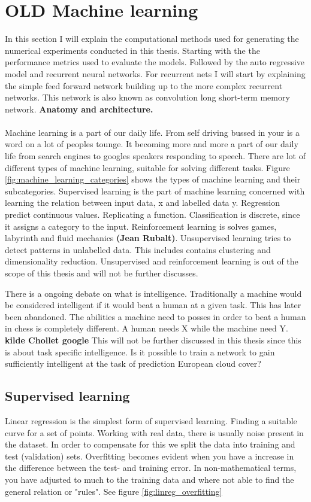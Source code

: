 \section{OLD Machine learning} \label{sec:intro_machine_learning}
In this section I will explain the computational methods used for generating the numerical experiments conducted in this thesis. Starting with the the performance metrics used to evaluate the models. Followed by the auto regressive model and recurrent neural networks. For recurrent nets I will start by explaining the simple feed forward network building up to the more complex recurrent networks. This network is also known as convolution long short-term memory network. \textbf{Anatomy and architecture.} 
\\ \\
Machine learning is a part of our daily life. From self driving bussed in  your is a word on a lot of peoples tounge. It becoming more and more a part of our daily life from search engines to googles speakers responding to speech. There are lot of different types of machine learning, suitable for solving different tasks. Figure \ref{fig:machine_learning_categories} shows the types of machine learning and their subcategories. Supervised learning is the part of machine learning concerned with learning the relation between input data, x and labelled data y. Regression predict continuous values. Replicating a function. Classification is discrete, since it assigns a category to the input. Reinforcement learning is solves games, labyrinth and fluid mechanics \textbf{(Jean Rubalt)}. Unsupervised learning tries to detect patterns in unlabelled data. This includes contains clustering and dimensionality reduction. Unsupervised and reinforcement learning is out of the scope of this thesis and will not be further discusses.

There is a ongoing debate on what is intelligence. Traditionally a machine would be considered intelligent if it would beat a human at a given task. This has later been abandoned. The abilities a machine need to posses in order to beat a human in chess is completely different. A human needs X while the machine need Y. \textbf{kilde Chollet google} This will not be further discussed in this thesis since this is about task specific intelligence. Is it possible to train a network to gain sufficiently intelligent at the task of prediction European cloud cover?

\subsection{Supervised learning} \label{sec:supervised_learning}
Linear regression is the simplest form of supervised learning. Finding a suitable curve for a set of points. Working with real data, there is usually noise present in the dataset. In order to compensate for this we split the data into training and test (validation) sets. Overfitting becomes evident when you have a increase in the difference between the test- and training error. In non-mathematical terms, you have adjusted to much to the training data and where not able to find the general relation or "rules". See figure \ref{fig:linreg_overfitting}

